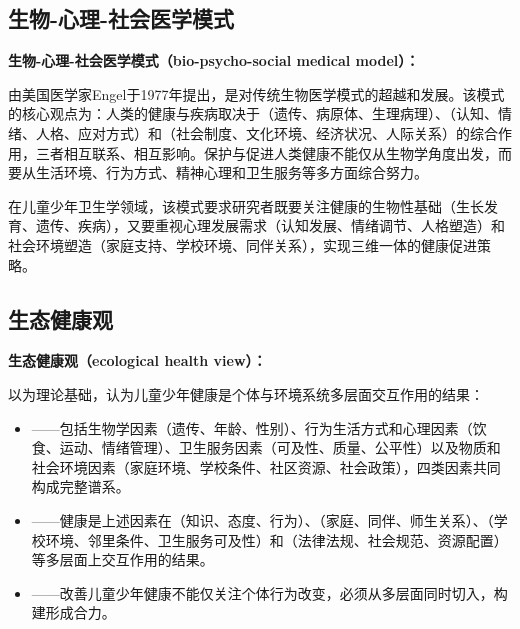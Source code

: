 \subsection{生物-心理-社会医学模式}

\begin{keybox}
\textbf{生物-心理-社会医学模式（bio-psycho-social medical model）：}

由美国医学家Engel于1977年提出，是对传统生物医学模式的超越和发展。该模式的核心观点为：人类的健康与疾病取决于（遗传、病原体、生理病理）、（认知、情绪、人格、应对方式）和（社会制度、文化环境、经济状况、人际关系）的综合作用，三者相互联系、相互影响。保护与促进人类健康不能仅从生物学角度出发，而要从生活环境、行为方式、精神心理和卫生服务等多方面综合努力。

在儿童少年卫生学领域，该模式要求研究者既要关注健康的生物性基础（生长发育、遗传、疾病），又要重视心理发展需求（认知发展、情绪调节、人格塑造）和社会环境塑造（家庭支持、学校环境、同伴关系），实现三维一体的健康促进策略。
\end{keybox}

\subsection{生态健康观}

\begin{keybox}
\textbf{生态健康观（ecological health view）：}

以为理论基础，认为儿童少年健康是个体与环境系统多层面交互作用的结果：

\begin{itemize}[leftmargin=*]
    \item {}——包括生物学因素（遗传、年龄、性别）、行为生活方式和心理因素（饮食、运动、情绪管理）、卫生服务因素（可及性、质量、公平性）以及物质和社会环境因素（家庭环境、学校条件、社区资源、社会政策），四类因素共同构成完整谱系。
    \item {}——健康是上述因素在（知识、态度、行为）、（家庭、同伴、师生关系）、（学校环境、邻里条件、卫生服务可及性）和（法律法规、社会规范、资源配置）等多层面上交互作用的结果。
    \item {}——改善儿童少年健康不能仅关注个体行为改变，必须从多层面同时切入，构建形成合力。
\end{itemize}
\end{keybox}

